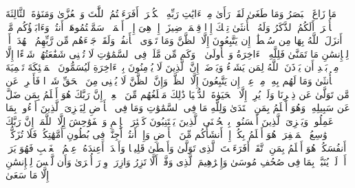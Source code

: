 \startbuffer[\q:53:17]
مَا زَاغَ ٱلۡبَصَرُ وَمَا طَغَىٰ%
\stopbuffer%
\startbuffer[\q:53:18]
لَقَدۡ رَأَىٰ مِنۡ ءَایَٰتِ رَبِّهِ ٱلۡكُبۡرَىٰۤ%
\stopbuffer%
\startbuffer[\q:53:19]
أَفَرَءَیۡتُمُ ٱللَّٰتَ وَٱلۡعُزَّىٰ%
\stopbuffer%
\startbuffer[\q:53:20]
وَمَنَوٰةَ ٱلثَّالِثَةَ ٱلۡأُخۡرَىٰۤ%
\stopbuffer%
\startbuffer[\q:53:21]
أَلَكُمُ ٱلذَّكَرُ وَلَهُ ٱلۡأُنثَىٰ%
\stopbuffer%
\startbuffer[\q:53:22]
تِلۡكَ إِذࣰا قِسۡمَةࣱ ضِیزَىٰۤ%
\stopbuffer%
\startbuffer[\q:53:23]
إِنۡ هِیَ إِلَّاۤ أَسۡمَاۤءࣱ سَمَّیۡتُمُوهَاۤ أَنتُمۡ وَءَابَاۤؤُكُم مَّاۤ أَنزَلَ ٱللَّهُ بِهَا مِن سُلۡطَٰنٍۚ إِن یَتَّبِعُونَ إِلَّا ٱلظَّنَّ وَمَا تَهۡوَى ٱلۡأَنفُسُۖ وَلَقَدۡ جَاۤءَهُم مِّن رَّبِّهِمُ ٱلۡهُدَىٰۤ%
\stopbuffer%
\startbuffer[\q:53:24]
أَمۡ لِلۡإِنسَٰنِ مَا تَمَنَّىٰ%
\stopbuffer%
\startbuffer[\q:53:25]
فَلِلَّهِ ٱلۡءَاخِرَةُ وَٱلۡأُولَىٰ%
\stopbuffer%
\startbuffer[\q:53:26]
۞ وَكَم مِّن مَّلَكࣲ فِی ٱلسَّمَٰوَٰتِ لَا تُغۡنِی شَفَٰعَتُهُمۡ شَیۡءًا إِلَّا مِنۢ بَعۡدِ أَن یَأۡذَنَ ٱللَّهُ لِمَن یَشَاۤءُ وَیَرۡضَىٰۤ%
\stopbuffer%
\startbuffer[\q:53:27]
إِنَّ ٱلَّذِینَ لَا یُؤۡمِنُونَ بِٱلۡءَاخِرَةِ لَیُسَمُّونَ ٱلۡمَلَٰۤئِكَةَ تَسۡمِیَةَ ٱلۡأُنثَىٰ%
\stopbuffer%
\startbuffer[\q:53:28]
وَمَا لَهُم بِهِۦ مِنۡ عِلۡمٍۖ إِن یَتَّبِعُونَ إِلَّا ٱلظَّنَّۖ وَإِنَّ ٱلظَّنَّ لَا یُغۡنِی مِنَ ٱلۡحَقِّ شَیۡءࣰا%
\stopbuffer%
\startbuffer[\q:53:29]
فَأَعۡرِضۡ عَن مَّن تَوَلَّىٰ عَن ذِكۡرِنَا وَلَمۡ یُرِدۡ إِلَّا ٱلۡحَیَوٰةَ ٱلدُّنۡیَا%
\stopbuffer%
\startbuffer[\q:53:30]
ذَٰلِكَ مَبۡلَغُهُم مِّنَ ٱلۡعِلۡمِۚ إِنَّ رَبَّكَ هُوَ أَعۡلَمُ بِمَن ضَلَّ عَن سَبِیلِهِۦ وَهُوَ أَعۡلَمُ بِمَنِ ٱهۡتَدَىٰ%
\stopbuffer%
\startbuffer[\q:53:31]
وَلِلَّهِ مَا فِی ٱلسَّمَٰوَٰتِ وَمَا فِی ٱلۡأَرۡضِ لِیَجۡزِیَ ٱلَّذِینَ أَسَٰۤءُوا۟ بِمَا عَمِلُوا۟ وَیَجۡزِیَ ٱلَّذِینَ أَحۡسَنُوا۟ بِٱلۡحُسۡنَى%
\stopbuffer%
\startbuffer[\q:53:32]
ٱلَّذِینَ یَجۡتَنِبُونَ كَبَٰۤئِرَ ٱلۡإِثۡمِ وَٱلۡفَوَٰحِشَ إِلَّا ٱللَّمَمَۚ إِنَّ رَبَّكَ وَٰسِعُ ٱلۡمَغۡفِرَةِۚ هُوَ أَعۡلَمُ بِكُمۡ إِذۡ أَنشَأَكُم مِّنَ ٱلۡأَرۡضِ وَإِذۡ أَنتُمۡ أَجِنَّةࣱ فِی بُطُونِ أُمَّهَٰتِكُمۡۖ فَلَا تُزَكُّوۤا۟ أَنفُسَكُمۡۖ هُوَ أَعۡلَمُ بِمَنِ ٱتَّقَىٰۤ%
\stopbuffer%
\startbuffer[\q:53:33]
أَفَرَءَیۡتَ ٱلَّذِی تَوَلَّىٰ%
\stopbuffer%
\startbuffer[\q:53:34]
وَأَعۡطَىٰ قَلِیلࣰا وَأَكۡدَىٰۤ%
\stopbuffer%
\startbuffer[\q:53:35]
أَعِندَهُۥ عِلۡمُ ٱلۡغَیۡبِ فَهُوَ یَرَىٰۤ%
\stopbuffer%
\startbuffer[\q:53:36]
أَمۡ لَمۡ یُنَبَّأۡ بِمَا فِی صُحُفِ مُوسَىٰ%
\stopbuffer%
\startbuffer[\q:53:37]
وَإِبۡرَٰهِیمَ ٱلَّذِی وَفَّىٰۤ%
\stopbuffer%
\startbuffer[\q:53:38]
أَلَّا تَزِرُ وَازِرَةࣱ وِزۡرَ أُخۡرَىٰ%
\stopbuffer%
\startbuffer[\q:53:39]
وَأَن لَّیۡسَ لِلۡإِنسَٰنِ إِلَّا مَا سَعَىٰ%

